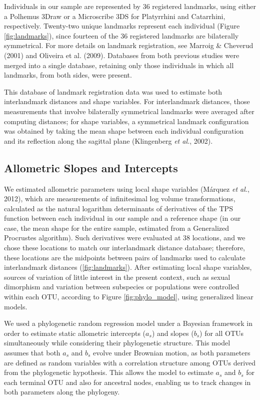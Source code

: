 \documentclass[12pt,]{article}
\begin{document}
Individuals in our sample are represented by 36 registered landmarks,
using either a Polhemus 3Draw or a Microscribe 3DS for Platyrrhini and
Catarrhini, respectively. Twenty-two unique landmarks represent each
individual (Figure \ref{fig:landmarks}), since fourteen of the 36
registered landmarks are bilaterally symmetrical. For more details on
landmark registration, see Marroig \& Cheverud (2001) and Oliveira et
al. (2009). Databases from both previous studies were merged into a
single database, retaining only those individuals in which all
landmarks, from both sides, were present.

This database of landmark registration data was used to estimate both
interlandmark distances and shape variables. For interlandmark
distances, those measurements that involve bilaterally symmetrical
landmarks were averaged after computing distances; for shape variables,
a symmetrical landmark configuration was obtained by taking the mean
shape between each individual configuration and its reflection along the
sagittal plane (Klingenberg \emph{et al.}, 2002).

\subsection{Allometric Slopes and
Intercepts}\label{allometric-slopes-and-intercepts}

We estimated allometric parameters using local shape variables (Márquez
\emph{et al.}, 2012), which are measurements of infinitesimal log volume
transformations, calculated as the natural logarithm determinants of
derivatives of the TPS function between each individual in our sample
and a reference shape (in our case, the mean shape for the entire
sample, estimated from a Generalized Procrustes algorithm). Such
derivatives were evaluated at 38 locations, and we chose these locations
to match our interlandmark distance database; therefore, these locations
are the midpoints between pairs of landmarks used to calculate
interlandmark distances (\autoref{fig:landmarks}). After estimating
local shape variables, sources of variation of little interest in the
present context, such as sexual dimorphism and variation between
subspecies or populations were controlled within each OTU, according to
Figure \ref{fig:phylo_model}, using generalized linear models.

We used a phylogenetic random regression model under a Bayesian
framework in order to estimate static allometric intercepts ($a_s$) and
slopes ($b_s$) for all OTUs simultaneously while considering their
phylogenetic structure. This model assumes that both $a_s$ and $b_s$
evolve under Brownian motion, as both parameters are defined as random
variables with a correlation structure among OTUs derived from the
phylogenetic hypothesis. This allows the model to estimate $a_s$ and
$b_s$ for each terminal OTU and also for ancestral nodes, enabling us to
track changes in both parameters along the phylogeny.
\end{document}
